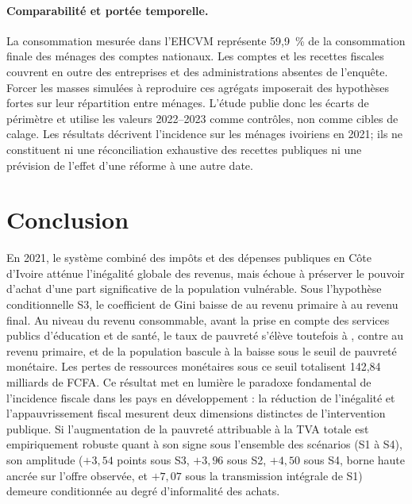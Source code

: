 \documentclass[11pt,a4paper]{article}
\begin{document}
\paragraph{Comparabilité et portée temporelle.}
La consommation mesurée dans l'EHCVM représente 59,9~\% de la consommation
finale des ménages des comptes nationaux. Les comptes et les recettes fiscales
couvrent en outre des entreprises et des administrations absentes de l'enquête.
Forcer les masses simulées à reproduire ces agrégats imposerait des hypothèses
fortes sur leur répartition entre ménages. L'étude publie donc les écarts de
périmètre et utilise les valeurs 2022--2023 comme contrôles, non comme cibles de
calage. Les résultats décrivent l'incidence sur les ménages ivoiriens en 2021;
ils ne constituent ni une réconciliation exhaustive des recettes publiques ni
une prévision de l'effet d'une réforme à une autre date.
\clearpage
\section{Conclusion}
\label{sec:conclusion}

En 2021, le système combiné des impôts et des dépenses publiques en Côte d'Ivoire atténue l'inégalité globale des revenus, mais échoue à préserver le pouvoir d'achat d'une part significative de la population vulnérable. Sous l'hypothèse conditionnelle S3, le coefficient de Gini baisse de \GiniPrimaire{} au revenu primaire à \GiniFinal{} au revenu final. Au niveau du revenu consommable, avant la prise en compte des services publics d'éducation et de santé, le taux de pauvreté s'élève toutefois à \PauvreteConsommable{}, contre \PauvretePrimaire{} au revenu primaire, et \PartNouveauxPauvres{} de la population bascule à la baisse sous le seuil de pauvreté monétaire. Les pertes de ressources monétaires sous ce seuil totalisent 142,84 milliards de FCFA. Ce résultat met en lumière le paradoxe fondamental de l'incidence fiscale dans les pays en développement : la réduction de l'inégalité et l'appauvrissement fiscal mesurent deux dimensions distinctes de l'intervention publique. Si l'augmentation de la pauvreté attribuable à la TVA totale est empiriquement robuste quant à son signe sous l'ensemble des scénarios (S1 à S4), son amplitude ($+3,54$ points sous S3, $+3,96$ sous S2, $+4,50$ sous S4, borne haute ancrée sur l'offre observée, et $+7,07$ sous la transmission intégrale de S1) demeure conditionnée au degré d'informalité des achats.
\end{document}
